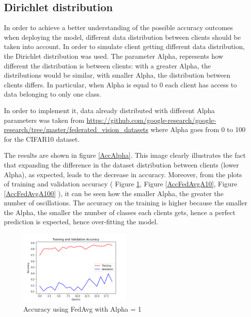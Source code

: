 \documentclass[twocolumn]{article}
\begin{document}
\subsection{Dirichlet distribution}

In order to achieve a better understanding of the possible accuracy outcomes when deploying the model, different data distribution between clients should be taken into account. In order to simulate client getting different data distribution, the Dirichlet distribution was used. The parameter Alpha, represents how different the distribution is between clients: with a greater Alpha, the distributions 
would be similar, with smaller Alpha, the distribution between clients differs.
In particular, when Alpha is equal to 0 each client has access to data belonging to only one class.

In order to implement it, data already distributed with different Alpha parameters was taken from \url{https://github.com/google-research/google-research/tree/master/federated_vision_datasets} where Alpha goes from 0 to 100 for the CIFAR10 dataset.



The results are shown in figure \ref{AccAlpha}. This image clearly illustrates the fact that expanding the difference in the dataset distribution between clients (lower Alpha), as expected, leads to the decrease in accuracy. 
Moreover, from the plots of training and validation accuracy ( Figure \ref{AccFedAvgA1}, Figure \ref{AccFedAvgA10}, Figure \ref{AccFedAvgA100} ), it can be seen how the smaller Alpha, the greater the number of oscillations.
The accuracy on the training is higher because the smaller the Alpha, the smaller the number of classes each clients gets, hence a perfect prediction is expected, hence over-fitting the model. 

\begin{figure}
    \centering
    \includegraphics[width=0.5\textwidth,height=.3\textheight]{2_AccuracyFedAvg_A1.png}
    \caption{Accuracy using FedAvg with Alpha = 1}
     \label{AccFedAvgA1} 
\end{figure}
\end{document}
